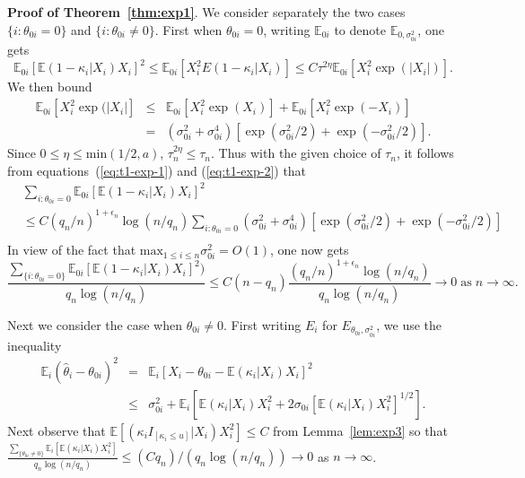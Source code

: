 \documentclass[sn-basic]{sn-jnl}%
\theoremstyle{thmstyleone}%
\begin{document}
\noindent
\textbf{Proof of Theorem~\ref{thm:exp1}}. We consider separately the two cases $\{i:\theta_{0i}=0\}$
and $\{i:\theta_{0i}\neq 0\}$. First when $\theta_{0i}=0$, writing
$\mathbb{E}_{0i}$ to denote $\mathbb{E}_{0,\sigma_{0i}^2}$, one gets
\begin{equation}
\mathbb{E}_{0i}[\mathbb{E}(1-\kappa_i|X_i)X_i]^2\leq \mathbb{E}_{0i}
[X_i^2E(1-\kappa_i|X_i)]
\leq C\tau^{2\eta}\mathbb{E}_{0i}[X_i^2\exp(|X_i|)].
\label{eq:t1-exp-1}
\end{equation}
We then bound
\begin{eqnarray}
\mathbb{E}_{0i}[X_i^2\exp(|X_i|] & \leq &
\mathbb{E}_{0i}[X_i^2\exp(X_i)]+\mathbb{E}_{0i}[X_i^2\exp(-X_i)]
\nonumber\\ & = & 
(\sigma_{0i}^2+\sigma_{0i}^4)[\exp(\sigma_{0i}^2/2)+\exp(-\sigma_{0i}^2/2)].
\label{eq:t1-exp-2}
\end{eqnarray}
Since $0\leq\eta\leq\mbox{min}(1/2,a)$, $\tau_n^{2\eta}\leq\tau_n$. 
Thus with the
given choice of $\tau_n$, it follows from equations~(\ref{eq:t1-exp-1}) and (\ref{eq:t1-exp-2}) that 
\begin{equation}
\begin{aligned}
&\sum_{i:\theta_{0i}=0} \mathbb{E}_{0i}[\mathbb{E}(1-\kappa_i|X_i)X_i]^2\\
&\leq
C(q_n/n)^{1+\epsilon_n}\log(n/q_n)\sum_{i:\theta_{0i}=0}
(\sigma_{0i}^2+\sigma_{0i}^4)[\exp(\sigma_{0i}^2/2)+\exp(-\sigma_{0i}^2/2)]\\
\label{eq:t1-exp-3}
\end{aligned}
\end{equation}
In view of  the fact that $\mbox{max}_{1\leq i\leq n}\sigma_{0i}^2=O(1)$,
one now gets
\begin{equation}
\frac{\sum_{\{i:\theta_{0i}=0\}} \mathbb{E}_{0i}[\mathbb{E}(1-\kappa_i|X_i)X_i]^2)}
{q_n\log(n/q_n)}\leq C(n-q_n)\frac{(q_n/n)^{1+\epsilon_n}\log(n/q_n)}
{q_n\log(n/q_n)}\rightarrow 0 \; \mbox{as} \; n\rightarrow\infty.
\label{eq:t1-exp-4}
\end{equation}

\noindent
Next we consider the case when $\theta_{0i}\neq 0$. First writing $E_i$ for 
$E_{\theta_{0i},\sigma_{0i}^2}$, we use the inequality
\begin{eqnarray}
\mathbb{E}_i(\hat{\theta}_i-\theta_{0i})^2 & = &
\mathbb{E}_i[X_i-\theta_{0i}-\mathbb{E}(\kappa_i|X_i)X_i]^2
\nonumber\\ & \leq & \sigma_{0i}^2+\mathbb{E}_i
[\mathbb{E}(\kappa_i|X_i)X_i^2+2 \sigma_{0i}[\mathbb{E}(\kappa_i|X_i)X_i^2]^{1/2}].
\label{eq:t1-exp-5}
\end{eqnarray}
Next observe that $\mathbb{E}[(\kappa_i I_{[\kappa_i\leq u]}|X_i)X_i^2]\leq C$ from
Lemma~\ref{lem:exp3} so that $\frac{\sum_{\{\theta_{0i}\neq 0\}}\mathbb{E}_i[\mathbb{E}(\kappa_i|X_i)X_i^2]}
{q_n\log(n/q_n)}\leq (Cq_n)/(q_n\log(n/q_n))
\rightarrow 0$ as $n\rightarrow\infty$.\\
\end{document}
